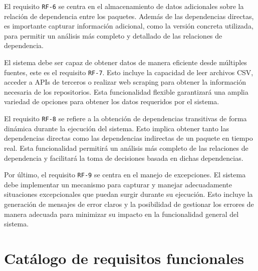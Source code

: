 El requisito \texttt{RF-6} se centra en el almacenamiento de datos adicionales sobre la
relación de dependencia entre los paquetes. Además de las dependencias directas, es
importante capturar información adicional, como la versión concreta utilizada, para
permitir un análisis más completo y detallado de las relaciones de dependencia.

El sistema debe ser capaz de obtener datos de manera eficiente desde múltiples fuentes, este
es el requisito \texttt{RF-7}. Esto incluye la capacidad de leer archivos CSV, acceder a
APIs de terceros o realizar web scraping para obtener la información necesaria de los
repositorios. Esta funcionalidad flexible garantizará una amplia variedad de opciones para
obtener los datos requeridos por el sistema.

El requisito \texttt{RF-8} se refiere a la obtención de dependencias transitivas de forma dinámica durante la ejecución
del sistema. Esto implica obtener tanto las dependencias directas como las dependencias
indirectas de un paquete en tiempo real. Esta funcionalidad permitirá un análisis más completo
de las relaciones de dependencia y facilitará la toma de decisiones basada en dichas dependencias.

Por último, el requisito \texttt{RF-9} se centra en el manejo de excepciones. El sistema
debe implementar un mecanismo para capturar y manejar adecuadamente situaciones excepcionales
que puedan surgir durante su ejecución. Esto incluye la generación de mensajes de error
claros y la posibilidad de gestionar los errores de manera adecuada para minimizar su
impacto en la funcionalidad general del sistema.

\section{Catálogo de requisitos funcionales}

